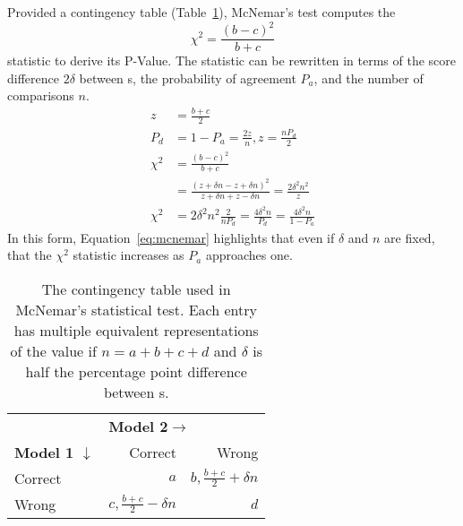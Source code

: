 Provided a contingency table (Table~\ref{tab:contingency}), McNemar's test computes the
\begin{equation}
    \chi^2=\frac{(b-c)^2}{b+c}
\end{equation}
statistic to derive its P-Value.
The statistic can be rewritten in terms of the score difference $2\delta$ between \subj{}s, the probability of agreement $P_a$, and the number of comparisons $n$.
\begin{align}
    z      & =\frac{b+c}{2}                                                                                                      \\
    P_d    & = 1-P_a =\frac{2z}{n}                                                                            , z=\frac{nP_d}{2} \\
    \chi^2 & =\frac{(b-c)^2}{b+c}                                                                                                \\
           & =\frac{(z+\delta n - z + \delta n)^2}{z+\delta n + z - \delta n}=\frac{2\delta^2 n^2}{z}                            \\
    \chi^2 & =2\delta^2 n^2\frac{2}{nP_d}=\frac{4\delta^2 n}{P_d}=\frac{4\delta^2 n}{1-P_a}\label{eq:mcnemar}
\end{align}
In this form, Equation~\ref{eq:mcnemar} highlights that even if $\delta$ and $n$ are fixed, that the $\chi^2$ statistic increases as $P_a$ approaches one.

\begin{table}[t]
    \centering
    \begin{tabular}{l r r}
        \toprule
                                      & \multicolumn{2}{l}{\textbf{Model 2$\rightarrow$}}                              \\
        \textbf{Model 1 $\downarrow$} & Correct                                           & Wrong                      \\
        \midrule
        Correct                       & $a$                                               & $b,\frac{b+c}{2}+\delta n$ \\
        Wrong                         & $c,\frac{b+c}{2}-\delta n$                        & $d$                        \\
        \bottomrule
    \end{tabular}
    \caption{The contingency table used in McNemar's statistical test.
        Each entry has multiple equivalent representations of the value if $n=a+b+c+d$ and $\delta$ is half the percentage point difference between \subj{}s.
    }
    \label{tab:contingency}
\end{table}